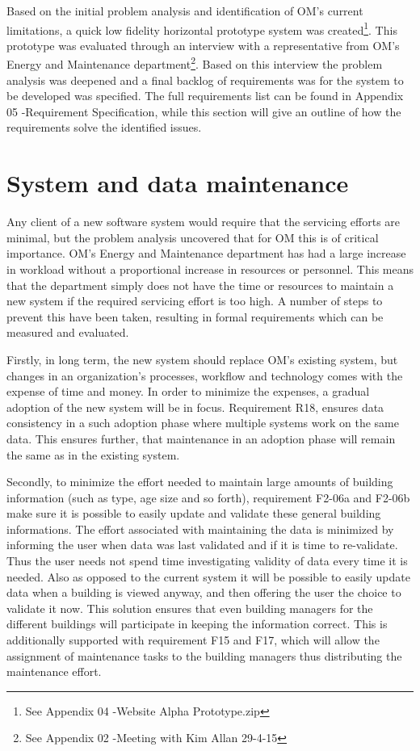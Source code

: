 Based on the initial problem analysis and identification of OM’s current limitations, a quick low fidelity horizontal prototype system was created\footnote{See Appendix 04 -Website Alpha Prototype.zip}. This prototype was evaluated through an interview with a representative from OM’s Energy and Maintenance department\footnote{See Appendix 02 -Meeting with Kim Allan 29-4-15}. Based on this interview the problem analysis was deepened and a final backlog of requirements was for the system to be developed was specified. The full requirements list can be found in Appendix 05 -Requirement Specification, while this section will give an outline of how the requirements solve the identified issues. 
\section{System and data maintenance}
Any client of a new software system would require that the servicing efforts are minimal, but the problem analysis uncovered that for OM this is of critical importance. OM’s Energy and Maintenance department has had a large increase in workload without a proportional increase in resources or personnel. This means that the department simply does not have the time or resources to maintain a new system if the required servicing effort is too high. A number of steps to prevent this have been taken, resulting in formal requirements which can be measured and evaluated. 

Firstly, in long term, the new system should replace OM’s existing system, but changes in an organization's processes, workflow and technology comes with the expense of time and money. In order to minimize the expenses, a gradual adoption of the new system will be in focus. Requirement R18, ensures data consistency in a such adoption phase where multiple systems work on the same data. This ensures further, that maintenance in an adoption phase will remain the same as in the existing system.

Secondly, to minimize the effort needed to maintain large amounts of building information (such as type, age size and so forth), requirement F2-06a and F2-06b make sure it is possible to easily update and validate these general building informations. The effort associated with maintaining the data is minimized by informing the user when data was last validated and if it is time to re-validate. Thus the user needs not spend time investigating validity of data every time it is needed. Also as opposed to the current system it will be possible to easily update data when a building is viewed anyway, and then offering the user the choice to validate it now. This solution ensures that even building managers for the different buildings will participate in keeping the information correct. This is additionally supported with requirement F15 and F17, which will allow the assignment of maintenance tasks to the building managers thus distributing the maintenance effort.

